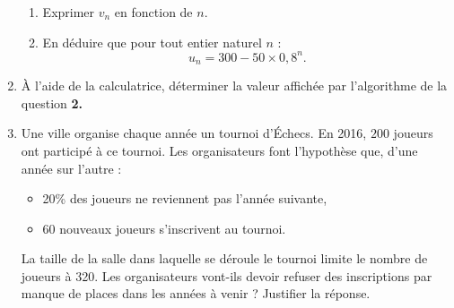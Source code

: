 \begin{enumerate}
\begin{enumerate}[label=\alph*.]
          \item %
          Exprimer $v_n$ en fonction de $n$.
          \item %
          En déduire que pour tout entier naturel $n$ :
          \[ u_n=300-50 \times 0,8^n. \]
     \end{enumerate}
     \item %
     \`A l'aide de la calculatrice, déterminer la valeur affichée par l'algorithme de la question \textbf{2.}
     \item %
     Une ville organise chaque année un tournoi d'\'Echecs.
     En 2016, $200$ joueurs ont participé à ce tournoi.
     Les organisateurs font l'hypothèse que, d'une année sur l'autre :
     \begin{itemize}
          \item 20\% des joueurs ne reviennent pas l'année suivante,
          \item 60 nouveaux joueurs s'inscrivent au tournoi.
     \end{itemize}
     La taille de la salle dans laquelle se déroule le tournoi limite le nombre de joueurs à 320.
     Les organisateurs vont-ils devoir refuser des inscriptions par manque de places dans les années à venir ?
     Justifier la réponse.
\end{enumerate}
